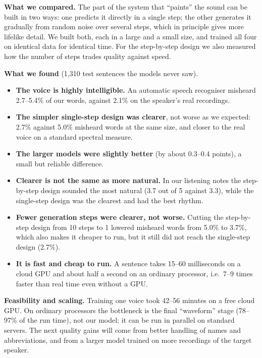 \documentclass[11pt,a4paper]{article}
\begin{document}
\noindent\textbf{What we compared.} The part of the system that ``paints'' the sound can be built in two ways: one predicts it directly in a single step; the other generates it gradually from random noise over several steps, which in principle gives more lifelike detail. We built both, each in a large and a small size, and trained all four on identical data for identical time. For the step-by-step design we also measured how the number of steps trades quality against speed.

\noindent\textbf{What we found} (1{,}310 test sentences the models never saw).
\begin{itemize}
  \item \textbf{The voice is highly intelligible.} An automatic speech recogniser misheard 2.7--5.4\% of our words, against 2.1\% on the speaker's real recordings.
  \item \textbf{The simpler single-step design was clearer}, not worse as we expected: 2.7\% against 5.0\% misheard words at the same size, and closer to the real voice on a standard spectral measure.
  \item \textbf{The larger models were slightly better} (by about 0.3--0.4 points), a small but reliable difference.
  \item \textbf{Clearer is not the same as more natural.} In our listening notes the step-by-step design sounded the most natural (3.7 out of 5 against 3.3), while the single-step design was the clearest and had the best rhythm.
  \item \textbf{Fewer generation steps were clearer, not worse.} Cutting the step-by-step design from 10 steps to 1 lowered misheard words from 5.0\% to 3.7\%, which also makes it cheaper to run, but it still did not reach the single-step design (2.7\%).
  \item \textbf{It is fast and cheap to run.} A sentence takes 15--60 milliseconds on a cloud GPU and about half a second on an ordinary processor, i.e.\ 7--9 times faster than real time even without a GPU.
\end{itemize}

\noindent\textbf{Feasibility and scaling.} Training one voice took 42--56 minutes on a free cloud GPU. On ordinary processors the bottleneck is the final ``waveform'' stage (78--97\% of the run time), not our model; it can be run in parallel on standard servers. The next quality gains will come from better handling of names and abbreviations, and from a larger model trained on more recordings of the target speaker.
\end{document}
